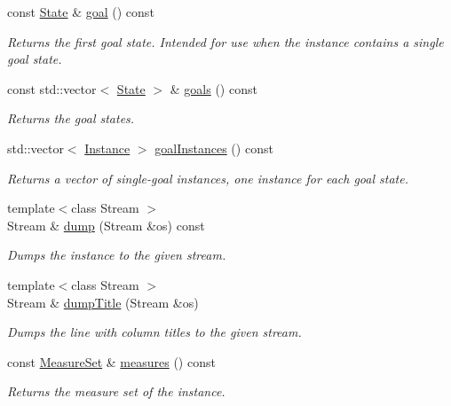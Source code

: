 \begin{DoxyCompactItemize}
const \hyperlink{structslb_1_1core_1_1sb_1_1Instance_a631205b5ee8d1a61a05c0d30f766ef2e}{State} \& \hyperlink{structslb_1_1core_1_1sb_1_1Instance_a8bb2fb56eff2e609fd7929449b141f8d}{goal} () const 
\begin{DoxyCompactList}\small\item\em Returns the first goal state. Intended for use when the instance contains a single goal state. \end{DoxyCompactList}\item 
const std\+::vector$<$ \hyperlink{structslb_1_1core_1_1sb_1_1Instance_a631205b5ee8d1a61a05c0d30f766ef2e}{State} $>$ \& \hyperlink{structslb_1_1core_1_1sb_1_1Instance_a5aed2f037cbdb04b8a41a13105388f1e}{goals} () const 
\begin{DoxyCompactList}\small\item\em Returns the goal states. \end{DoxyCompactList}\item 
std\+::vector$<$ \hyperlink{structslb_1_1core_1_1sb_1_1Instance}{Instance} $>$ \hyperlink{structslb_1_1core_1_1sb_1_1Instance_a049e21f64e6fbec805db3732dd06e7b4}{goal\+Instances} () const 
\begin{DoxyCompactList}\small\item\em Returns a vector of single-\/goal instances, one instance for each goal state. \end{DoxyCompactList}\item 
{\footnotesize template$<$class Stream $>$ }\\Stream \& \hyperlink{structslb_1_1core_1_1sb_1_1Instance_a97f58fb3459fb7c4b5e5978ffb2276c6}{dump} (Stream \&os) const 
\begin{DoxyCompactList}\small\item\em Dumps the instance to the given stream. \end{DoxyCompactList}\item 
{\footnotesize template$<$class Stream $>$ }\\Stream \& \hyperlink{structslb_1_1core_1_1sb_1_1Instance_acc69fbc389b99e7c5a2dfe6357c45034}{dump\+Title} (Stream \&os)
\begin{DoxyCompactList}\small\item\em Dumps the line with column titles to the given stream. \end{DoxyCompactList}\item 
const \hyperlink{structslb_1_1core_1_1sb_1_1MeasureSet}{Measure\+Set} \& \hyperlink{structslb_1_1core_1_1sb_1_1Instance_ad2e01a665a65c711a952491cf1790d0f}{measures} () const 
\begin{DoxyCompactList}\small\item\em Returns the measure set of the instance. \end{DoxyCompactList}\end{DoxyCompactItemize}
